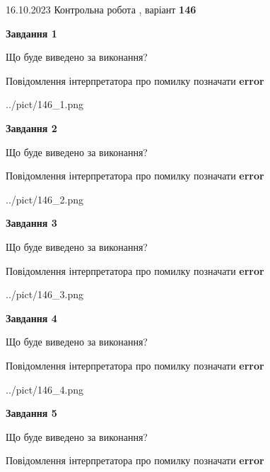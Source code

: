 \documentclass[12pt, ukrainian]{article}
\begin{document}
{\Large{16.10.2023 Контрольна робота , варіант  \No \textbf { 146 }\par}}
{
\begin {large}
{\begin {center}\textbf{Завдання 1}\end {center}}\par
Що буде виведено за виконання? \par
Повідомлення інтерпретатора про помилку позначати \textbf{error}

\begin{center}
	{../pict/146_1.png}
\end{center}
\newpage

{\begin {center}\textbf{Завдання 2}\end {center}}\par
Що буде виведено за виконання? \par
Повідомлення інтерпретатора про помилку позначати \textbf{error}

\begin{center}
	{../pict/146_2.png}
\end{center}
\newpage

{\begin {center}\textbf{Завдання 3}\end {center}}\par
Що буде виведено за виконання? \par
Повідомлення інтерпретатора про помилку позначати \textbf{error}

\begin{center}
	{../pict/146_3.png}
\end{center}
\newpage

{\begin {center}\textbf{Завдання 4}\end {center}}\par
Що буде виведено за виконання? \par
Повідомлення інтерпретатора про помилку позначати \textbf{error}

\begin{center}
	{../pict/146_4.png}
\end{center}
\newpage

{\begin {center}\textbf{Завдання 5}\end {center}}\par
Що буде виведено за виконання? \par
Повідомлення інтерпретатора про помилку позначати \textbf{error}


\end{large}}
\end{document}
